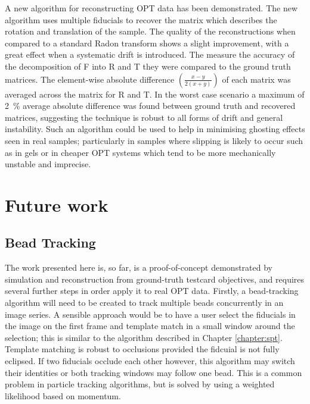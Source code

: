 A new algorithm for reconstructing OPT data has been demonstrated.
The new algorithm uses multiple fiducials to recover the matrix which describes the rotation and translation of the sample.
The quality of the reconstructions when compared to a standard \gls{Radon transform} shows a slight improvement, with a great effect when a systematic drift is introduced.
The measure the accuracy of the decomposition of \gls{F} into \gls{R} and \gls{T} they were compared to the ground truth matrices.
The element-wise absolute difference \(\left(\frac{x-y}{2(x+y)}\right)\) of each matrix was averaged across the matrix for \gls{R} and \gls{T}.
In the worst case scenario a maximum of \SI{2}{\percent} average absolute difference was found between ground truth and recovered matrices,
suggesting the technique is robust to all forms of drift and general instability.
Such an algorithm could be used to help in minimising ghosting effects seen in real samples; particularly in samples where slipping is likely to occur such as in gels or in cheaper \gls{OPT} systems which tend to be more mechanically unstable and imprecise.

\section{Future work}

\subsection{Bead Tracking}
The work presented here is, so far, is a proof-of-concept demonstrated by simulation and reconstruction from ground-truth testcard objectives, and requires several further steps in order apply it to real \gls{OPT} data.
Firstly, a bead-tracking algorithm\cite{crockerMethodsDigitalVideo1996a} will need to be created to track multiple beads concurrently in an image series.
A sensible approach would be to have a user select the fiducials in the image on the first frame and template match in a small window around the selection; this is similar to the algorithm described in Chapter \ref{chapter:spt}. %
Template matching is robust to occlusions provided the fidcuial is not fully eclipsed.
If two fiducials occlude each other however, this algorithm may switch their identities or both tracking windows may follow one bead.
This is a common problem in particle tracking algorithms, but is solved by using a weighted likelihood based on momentum\cite{chenouardMultipleHypothesisTracking2013}.

